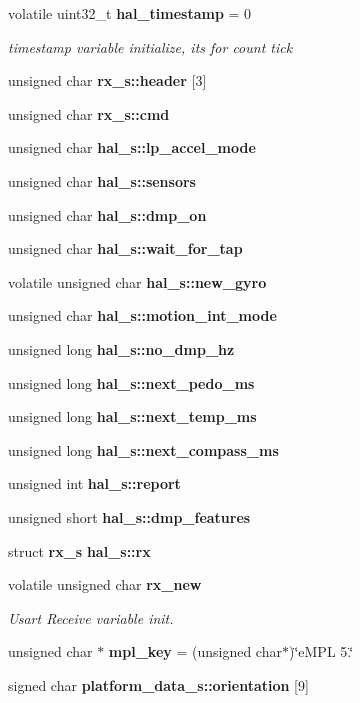 \begin{DoxyCompactItemize}
\item 
volatile uint32\+\_\+t \textbf{ hal\+\_\+timestamp} = 0
\begin{DoxyCompactList}\small\item\em timestamp variable initialize, its for count tick \end{DoxyCompactList}\item 
unsigned char \textbf{ rx\+\_\+s\+::header} [3]
\item 
unsigned char \textbf{ rx\+\_\+s\+::cmd}
\item 
unsigned char \textbf{ hal\+\_\+s\+::lp\+\_\+accel\+\_\+mode}
\item 
unsigned char \textbf{ hal\+\_\+s\+::sensors}
\item 
unsigned char \textbf{ hal\+\_\+s\+::dmp\+\_\+on}
\item 
unsigned char \textbf{ hal\+\_\+s\+::wait\+\_\+for\+\_\+tap}
\item 
volatile unsigned char \textbf{ hal\+\_\+s\+::new\+\_\+gyro}
\item 
unsigned char \textbf{ hal\+\_\+s\+::motion\+\_\+int\+\_\+mode}
\item 
unsigned long \textbf{ hal\+\_\+s\+::no\+\_\+dmp\+\_\+hz}
\item 
unsigned long \textbf{ hal\+\_\+s\+::next\+\_\+pedo\+\_\+ms}
\item 
unsigned long \textbf{ hal\+\_\+s\+::next\+\_\+temp\+\_\+ms}
\item 
unsigned long \textbf{ hal\+\_\+s\+::next\+\_\+compass\+\_\+ms}
\item 
unsigned int \textbf{ hal\+\_\+s\+::report}
\item 
unsigned short \textbf{ hal\+\_\+s\+::dmp\+\_\+features}
\item 
struct \textbf{ rx\+\_\+s} \textbf{ hal\+\_\+s\+::rx}
\item 
volatile unsigned char \textbf{ rx\+\_\+new}
\begin{DoxyCompactList}\small\item\em Usart Receive variable init. \end{DoxyCompactList}\item 
unsigned char $\ast$ \textbf{ mpl\+\_\+key} = (unsigned char$\ast$)\char`\"{}e\+M\+PL 5.\char`\"{}
\item 
signed char \textbf{ platform\+\_\+data\+\_\+s\+::orientation} [9]
\end{DoxyCompactItemize}


